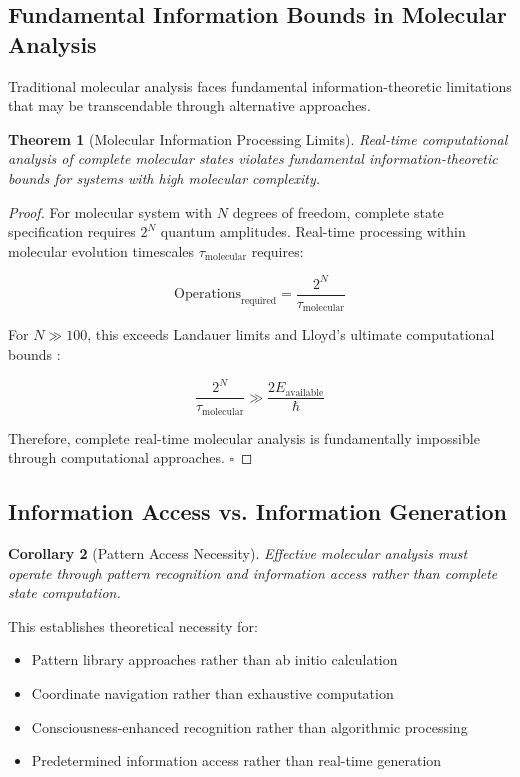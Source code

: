 \documentclass[11pt,a4paper]{article}
\newtheorem{theorem}{Theorem}[section]
\newtheorem{corollary}[theorem]{Corollary}
\theoremstyle{remark}
\begin{document}
{{{{{{{{{{\subsection{Fundamental Information Bounds in Molecular Analysis}

Traditional molecular analysis faces fundamental information-theoretic limitations that may be transcendable through alternative approaches.

\begin{theorem}[Molecular Information Processing Limits]
Real-time computational analysis of complete molecular states violates fundamental information-theoretic bounds for systems with high molecular complexity.
\end{theorem}

\begin{proof}
For molecular system with $N$ degrees of freedom, complete state specification requires $2^N$ quantum amplitudes. Real-time processing within molecular evolution timescales $\tau_{\text{molecular}}$ requires:

$$\text{Operations}_{\text{required}} = \frac{2^N}{\tau_{\text{molecular}}}$$

For $N \gg 100$, this exceeds Landauer limits and Lloyd's ultimate computational bounds \cite{landauer1961irreversibility,lloyd2000ultimate}:

$$\frac{2^N}{\tau_{\text{molecular}}} \gg \frac{2E_{\text{available}}}{\hbar}$$

Therefore, complete real-time molecular analysis is fundamentally impossible through computational approaches. $\square$
\end{proof}

\subsection{Information Access vs. Information Generation}

\begin{corollary}[Pattern Access Necessity]
Effective molecular analysis must operate through pattern recognition and information access rather than complete state computation.
\end{corollary}

This establishes theoretical necessity for:
\begin{itemize}
\item Pattern library approaches rather than ab initio calculation
\item Coordinate navigation rather than exhaustive computation
\item Consciousness-enhanced recognition rather than algorithmic processing
\item Predetermined information access rather than real-time generation
\end{itemize}

}}}}}}}}}}
\end{document}
